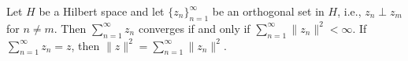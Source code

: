 Let $H$ be a Hilbert space and let $\{z_n\}_{n=1}^{\infty}$ be an orthogonal set in $H$, i.e., $z_n \perp z_m$ for $n \neq m$. Then $\sum_{n=1}^{\infty} z_n$ converges if and only if $\sum_{n=1}^{\infty} \|z_n\|^2 < \infty$. If $\sum_{n=1}^{\infty} z_n = z$, then $\|z\|^2 = \sum_{n=1}^{\infty} \|z_n\|^2$.